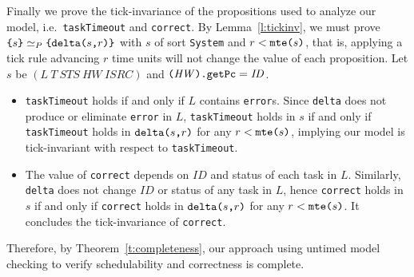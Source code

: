 \documentclass[12pt,onecolumn]{IEEEtranTIE}
\begin{document}
\begin{IEEEproof}
Finally we prove the tick-invariance of the propositions used to
analyze our model, i.e.\ \verb|taskTimeout| and \verb|correct|. By
Lemma~\ref{l:tickinv}, we must prove
$\verb|{|s\verb|}|\simeq_P\verb|{|\deltaS{s}{r}\verb|}|$ with $s$ of
sort \verb|System| and $r<\texttt{mte(}s\texttt{)}$, that is, applying a tick rule
advancing $r$ time units will not change the value of each
proposition. Let $s$ be $(L~T~\mathit{STS}~\mathit{HW}~\mathit{ISRC})$
and $\verb|(|\mathit{HW}\verb|).getPc|=\mathit{ID}$.
\begin{itemize}
\item \verb|taskTimeout| holds if and only if $L$ contains
  \verb|error|s. Since \verb|delta| does not produce or eliminate
  \verb|error| in $L$, \verb|taskTimeout| holds in $s$ if and only if
  \verb|taskTimeout| holds in $\texttt{delta(}s\texttt{,}r\texttt{)}$ for any $r<\texttt{mte(}s\texttt{)}$,
  implying our model is tick-invariant with respect to
  \verb|taskTimeout|.
\item The value of \verb|correct| depends on $\mathit{ID}$ and
  status of each task in $L$. Similarly, \verb|delta| does not change
  $\mathit{ID}$ or status of any task in $L$, hence \verb|correct|
  holds in $s$ if and only if \verb|correct| holds in $\texttt{delta(}s\texttt{,}r\texttt{)}$
  for any $r<\texttt{mte(}s\texttt{)}$. It concludes the tick-invariance of
  \verb|correct|.
\end{itemize}

Therefore, by Theorem~\ref{t:completeness}, our approach using untimed
model checking to verify schedulability and correctness is complete.
\end{IEEEproof}


\end{document}
